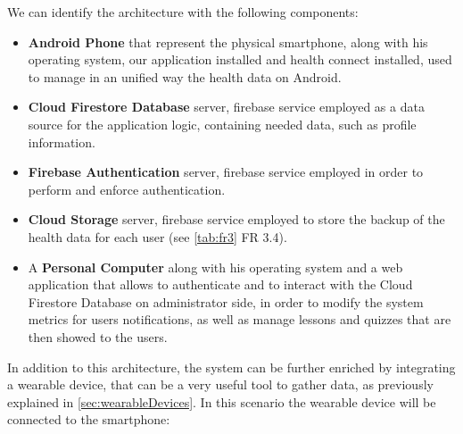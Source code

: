 \newpage
\noindent We can identify the architecture with the following components:
\vspace{3ex}
\begin{itemize}[nosep] %
    \item \textbf{Android Phone} that represent the physical smartphone, along with his operating system, our application installed and health connect installed, used to manage in an unified way the health data on Android.
    \item \textbf{Cloud Firestore Database} server, firebase service employed as a data source for the application logic, containing needed data, such as profile information.
    \item \textbf{Firebase Authentication} server, firebase service employed in order to perform and enforce authentication.
    \item \textbf{Cloud Storage} server, firebase service employed to store the backup of the health data for each user (see \cref{tab:fr3} FR 3.4).
    \item A \textbf{Personal Computer} along with his operating system and a web application that allows to authenticate and to interact with the Cloud Firestore Database on administrator side, in order to modify the system metrics for users notifications, as well as manage lessons and quizzes that are then showed to the users.  
\end{itemize}

\newpage
\noindent In addition to this architecture, the system can be further enriched by integrating a wearable device, that can be a very useful tool to gather data, as previously explained in \cref{sec:wearableDevices}. In this scenario the wearable device will be connected to the smartphone:

